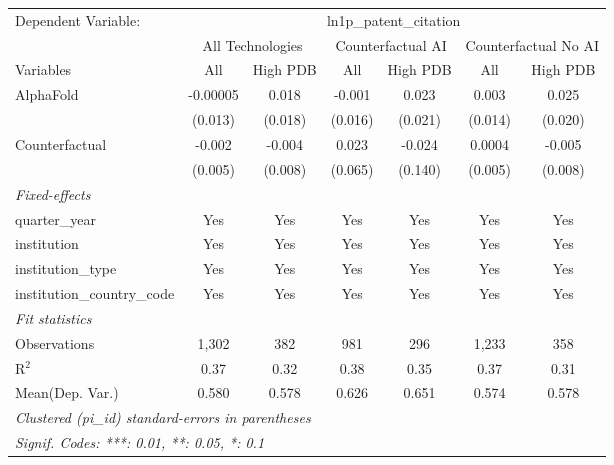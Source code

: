 \begingroup
\centering
\begin{tabular}{lcccccc}
   \tabularnewline \midrule \midrule
   Dependent Variable: & \multicolumn{6}{c}{ln1p\_patent\_citation}\\
 & \multicolumn{2}{c}{All Technologies} & \multicolumn{2}{c}{Counterfactual AI} & \multicolumn{2}{c}{Counterfactual No AI} \\
\cmidrule(lr){1-1}\cmidrule(lr){2-3} \cmidrule(lr){4-5} \cmidrule(lr){6-7}
Variables & \multicolumn{1}{c}{All} & \multicolumn{1}{c}{High PDB} & \multicolumn{1}{c}{All} & \multicolumn{1}{c}{High PDB} & \multicolumn{1}{c}{All} & \multicolumn{1}{c}{High PDB} \\
\cmidrule(lr){1-1}\cmidrule(lr){2-2} \cmidrule(lr){3-3} \cmidrule(lr){4-4} \cmidrule(lr){5-5} \cmidrule(lr){6-6} \cmidrule(lr){7-7}
   AlphaFold                    & -0.00005 & 0.018   & -0.001  & 0.023   & 0.003   & 0.025\\   
                                & (0.013)  & (0.018) & (0.016) & (0.021) & (0.014) & (0.020)\\   
   Counterfactual               & -0.002   & -0.004  & 0.023   & -0.024  & 0.0004  & -0.005\\   
                                & (0.005)  & (0.008) & (0.065) & (0.140) & (0.005) & (0.008)\\   
   \midrule
   \emph{Fixed-effects}\\
   quarter\_year                & Yes      & Yes     & Yes     & Yes     & Yes     & Yes\\  
   institution                  & Yes      & Yes     & Yes     & Yes     & Yes     & Yes\\  
   institution\_type            & Yes      & Yes     & Yes     & Yes     & Yes     & Yes\\  
   institution\_country\_code   & Yes      & Yes     & Yes     & Yes     & Yes     & Yes\\  
   \midrule
   \emph{Fit statistics}\\
   Observations                 & 1,302    & 382     & 981     & 296     & 1,233   & 358\\  
   R$^2$                        & 0.37     & 0.32    & 0.38    & 0.35    & 0.37    & 0.31\\  
Mean(Dep. Var.) & 0.580 & 0.578 & 0.626 & 0.651 & 0.574 & 0.578 \\
   \midrule \midrule
   \multicolumn{7}{l}{\emph{Clustered (pi\_id) standard-errors in parentheses}}\\
   \multicolumn{7}{l}{\emph{Signif. Codes: ***: 0.01, **: 0.05, *: 0.1}}\\
\end{tabular}
\par\endgroup
